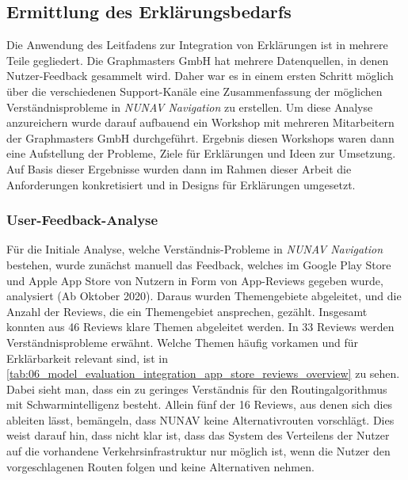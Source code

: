 \subsection{Ermittlung des Erklärungsbedarfs}

Die Anwendung des Leitfadens zur Integration von Erklärungen ist in mehrere Teile gegliedert. Die Graphmasters GmbH hat mehrere Datenquellen, in denen Nutzer-Feedback gesammelt wird. Daher war es in einem ersten Schritt möglich über die verschiedenen Support-Kanäle eine Zusammenfassung der möglichen Verständnisprobleme in \textit{NUNAV Navigation} zu erstellen. Um diese Analyse anzureichern wurde darauf aufbauend ein Workshop mit mehreren Mitarbeitern der Graphmasters GmbH durchgeführt. Ergebnis diesen Workshops waren dann eine Aufstellung der Probleme, Ziele für Erklärungen und Ideen zur Umsetzung. Auf Basis dieser Ergebnisse wurden dann im Rahmen dieser Arbeit die Anforderungen konkretisiert und in Designs für Erklärungen umgesetzt.

\subsubsection{User-Feedback-Analyse}

Für die Initiale Analyse, welche Verständnis-Probleme in \textit{NUNAV Navigation} bestehen, wurde zunächst manuell das Feedback, welches im Google Play Store und Apple App Store von Nutzern in Form von App-Reviews gegeben wurde, analysiert (Ab Oktober 2020). Daraus wurden Themengebiete abgeleitet, und die Anzahl der Reviews, die ein Themengebiet ansprechen, gezählt. Insgesamt konnten aus 46 Reviews klare Themen abgeleitet werden. In 33 Reviews werden Verständnisprobleme erwähnt. Welche Themen häufig vorkamen und für Erklärbarkeit relevant sind, ist in \autoref{tab:06_model_evaluation_integration_app_store_reviews_overview} zu sehen. Dabei sieht man, dass ein zu geringes Verständnis für den Routingalgorithmus mit Schwarmintelligenz besteht. Allein fünf der 16 Reviews, aus denen sich dies ableiten lässt, bemängeln, dass NUNAV keine Alternativrouten vorschlägt. Dies weist darauf hin, dass nicht klar ist, dass das System des Verteilens der Nutzer auf die vorhandene Verkehrsinfrastruktur nur möglich ist, wenn die Nutzer den vorgeschlagenen Routen folgen und keine Alternativen nehmen.

